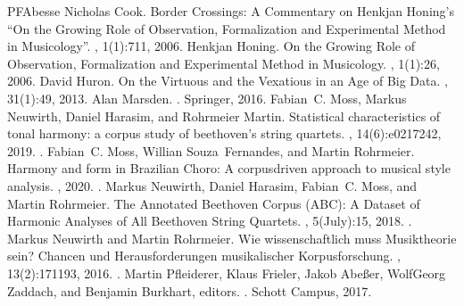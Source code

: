 \documentclass[letterpaper,10pt,english]{sphinxmanual}
\begin{document}
\begin{sphinxthebibliography}{PFAbesse}
Nicholas Cook. Border Crossings: A Commentary on Henkjan Honing’s “On the Growing Role of Observation, Formalization and Experimental Method in Musicology”. , 1(1):7\textendash{}11, 2006.
Henkjan Honing. On the Growing Role of Observation, Formalization and Experimental Method in Musicology. , 1(1):2\textendash{}6, 2006.
David Huron. On the Virtuous and the Vexatious in an Age of Big Data. , 31(1):4\textendash{}9, 2013.
Alan Marsden. . Springer, 2016.
Fabian C. Moss, Markus Neuwirth, Daniel Harasim, and Rohrmeier Martin. Statistical characteristics of tonal harmony: a corpus study of beethoven’s string quartets. , 14(6):e0217242, 2019. .
Fabian C. Moss, Willian Souza Fernandes, and Martin Rohrmeier. Harmony and form in Brazilian Choro: A corpus\sphinxhyphen{}driven approach to musical style analysis. , 2020. .
Markus Neuwirth, Daniel Harasim, Fabian C. Moss, and Martin Rohrmeier. The Annotated Beethoven Corpus (ABC): A Dataset of Harmonic Analyses of All Beethoven String Quartets. , 5(July):1\textendash{}5, 2018. .
Markus Neuwirth and Martin Rohrmeier. Wie wissenschaftlich muss Musiktheorie sein? Chancen und Herausforderungen musikalischer Korpusforschung. , 13(2):171\textendash{}193, 2016. .
Martin Pfleiderer, Klaus Frieler, Jakob Abeßer, Wolf\sphinxhyphen{}Georg Zaddach, and Benjamin Burkhart, editors. . Schott Campus, 2017.

\end{sphinxthebibliography}
\end{document}

